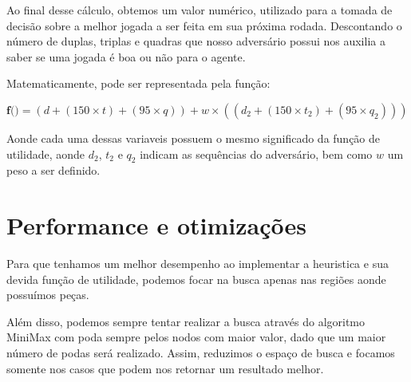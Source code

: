 \documentclass{article}
\begin{document}
      Ao final desse cálculo, obtemos um valor numérico, utilizado para a tomada de decisão sobre a melhor jogada a ser
      feita em sua próxima rodada. Descontando o número de duplas, triplas e quadras que nosso adversário possui nos
      auxilia a saber se uma jogada é boa ou não para o agente.
  
      Matematicamente, pode ser representada pela função:
  
      \vspace{.5em}
      $\textbf{f()} = (d + (150 \times t) + (95 \times q)) + w \times ((d_2 + (150 \times t_2) + (95 \times q_2)))$
      \vspace{.5em}
  
      Aonde cada uma dessas variaveis possuem o mesmo significado da função de utilidade, aonde $d_2$, $t_2$ e $q_2$
      indicam as sequências do adversário, bem como \textbf{$w$} um peso a ser definido.
  
  \section{Performance e otimizações}
    Para que tenhamos um melhor desempenho ao implementar a heuristica e sua devida função de utilidade, podemos
    focar na busca apenas nas regiões aonde possuímos peças.
  
    Além disso, podemos sempre tentar realizar a busca através do algoritmo MiniMax com poda sempre pelos nodos com
    maior valor, dado que um maior número de podas será realizado. Assim, reduzimos o espaço de busca e focamos
    somente nos casos que podem nos retornar um resultado melhor.
  
  
\end{document}
